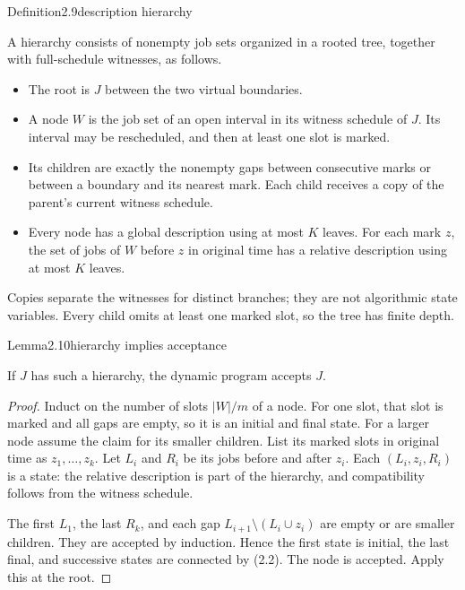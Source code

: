\begin{numberedup}{Definition}{2.9}{description hierarchy}

A hierarchy consists of nonempty job sets organized in a rooted tree, together with full-schedule witnesses, as follows.

\begin{itemize}
\tightlist
\item
  The root is \(J\) between the two virtual boundaries.
\item
  A node \(W\) is the job set of an open interval in its witness schedule of \(J\). Its interval may be rescheduled, and then at least one slot is marked.
\item
  Its children are exactly the nonempty gaps between consecutive marks or between a boundary and its nearest mark. Each child receives a copy of the parent's current witness schedule.
\item
  Every node has a global description using at most \(K\) leaves. For each mark \(z\), the set of jobs of \(W\) before \(z\) in original time has a relative description using at most \(K\) leaves.
\end{itemize}

Copies separate the witnesses for distinct branches; they are not algorithmic state variables. Every child omits at least one marked slot, so the tree has finite depth.

\end{numberedup}

\begin{numbered}{Lemma}{2.10}{hierarchy implies acceptance}

If \(J\) has such a hierarchy, the dynamic program accepts \(J\).

\end{numbered}

\begin{proof}
Induct on the number of slots \(|W|/m\) of a node. For one slot, that slot is marked and all gaps are empty, so it is an initial and final state. For a larger node assume the claim for its smaller children. List its marked slots in original time as \(z_1,\ldots,z_k\). Let \(L_i\) and \(R_i\) be its jobs before and after \(z_i\). Each \((L_i,z_i,R_i)\) is a state: the relative description is part of the hierarchy, and compatibility follows from the witness schedule.

The first \(L_1\), the last \(R_k\), and each gap \(L_{i+1}\setminus(L_i\cup z_i)\) are empty or are smaller children. They are accepted by induction. Hence the first state is initial, the last final, and successive states are connected by (2.2). The node is accepted. Apply this at the root.
\end{proof}

